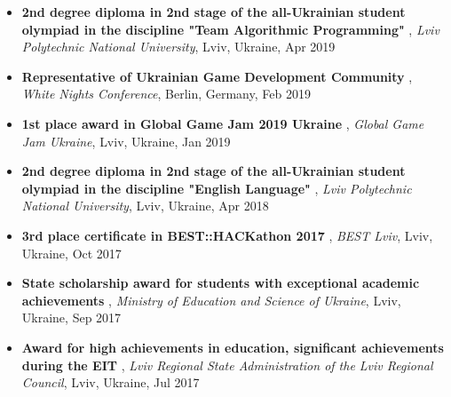 \documentclass[letterpaper,10pt]{article}
\newcommand{\titleItem}[1]{
  \textbf{#1}
}
\begin{document}
\begin{itemize}[leftmargin=0.15in, label={}]
    \item
			\titleItem{2nd degree diploma in 2nd stage of the all-Ukrainian student olympiad in the discipline "Team Algorithmic Programming"}, \emph{Lviv Polytechnic National University}, {Lviv, Ukraine}, Apr 2019
			\vspace{-9pt}
		
    \item
			\titleItem{Representative of Ukrainian Game Development Community}, \emph{White Nights Conference}, {Berlin, Germany}, Feb 2019
			\vspace{-9pt}
		
    \item
			\titleItem{1st place award in Global Game Jam 2019 Ukraine}, \emph{Global Game Jam Ukraine}, {Lviv, Ukraine}, Jan 2019
			\vspace{-9pt}
		
    \item
			\titleItem{2nd degree diploma in 2nd stage of the all-Ukrainian student olympiad in the discipline "English Language"}, \emph{Lviv Polytechnic National University}, {Lviv, Ukraine}, Apr 2018
			\vspace{-9pt}
		
    \item
			\titleItem{3rd place certificate in BEST::HACKathon 2017}, \emph{BEST Lviv}, {Lviv, Ukraine}, Oct 2017
			\vspace{-9pt}
		
    \item
			\titleItem{State scholarship award for students with exceptional academic achievements}, \emph{Ministry of Education and Science of Ukraine}, {Lviv, Ukraine}, Sep 2017
			\vspace{-9pt}
		
    \item
			\titleItem{Award for high achievements in education, significant achievements during the EIT}, \emph{Lviv Regional State Administration of the Lviv Regional Council}, {Lviv, Ukraine}, Jul 2017
			\vspace{-9pt}
		
    \end{itemize}
	

\end{document}
